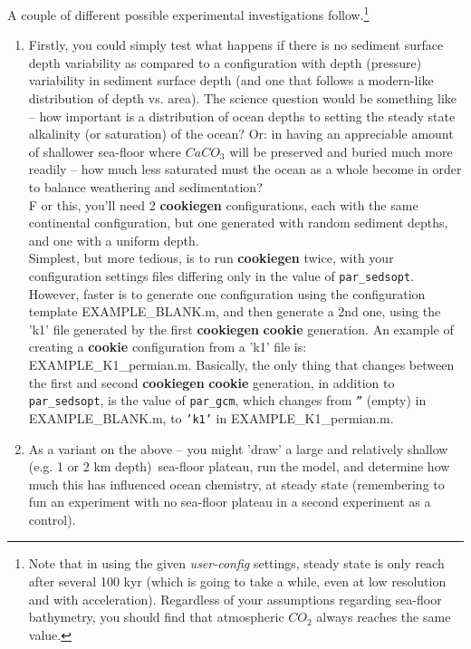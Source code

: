 \noindent A couple of different possible experimental investigations follow.\footnote{Note that in using the given \textit{user-config} settings, steady state is only reach after several 100 kyr (which is going to take a while, even at low resolution and with acceleration). Regardless of your assumptions regarding sea-floor bathymetry, you should find that atmospheric \(CO_{2}\) always reaches the same value.
}
\begin{enumerate}[noitemsep]

\vspace{1mm}
\item Firstly, you could simply test what happens if there is no sediment surface depth variability as compared to a configuration with depth (pressure) variability in sediment surface depth (and one that follows a modern-like distribution of depth vs. area). The science question would be something like -- how important is a distribution of ocean depths to setting the steady state alkalinity (or saturation) of the ocean? Or: in having an appreciable amount of shallower sea-floor where \(CaCO_{3}\) will be preserved and buried much more readily -- how much less saturated must the ocean as a whole become in order to balance weathering and sedimentation?
\\F or this, you'll need 2 \textbf{cookiegen} configurations, each with the same continental configuration, but one generated with random sediment depths, and one with a uniform depth.
\\Simplest, but more tedious, is to run \textbf{cookiegen} twice, with your  configuration settings files differing only in the value of \texttt{par\_sedsopt}. However, faster is to generate one configuration using the configuration template \textsf{\footnotesize EXAMPLE\_BLANK.m}, and then generate a 2nd one, using the 'k1' file generated by the first \textbf{cookiegen} \textbf{cookie} generation. An example of creating a \textbf{cookie} configuration from a 'k1' file is: \textsf{\footnotesize EXAMPLE\_K1\_permian.m}. Basically, the only thing that changes between the first and second \textbf{cookiegen} \textbf{cookie} generation, in addition to \texttt{par\_sedsopt}, is the value of \texttt{par\_gcm}, which changes from \texttt{''} (empty) in \textsf{\footnotesize EXAMPLE\_BLANK.m}, to \texttt{'k1'} in \textsf{\footnotesize EXAMPLE\_K1\_permian.m}.

\vspace{1mm}
\item As a variant on the above -- you might 'draw' a large and relatively shallow (e.g. 1 or 2 km depth)\ sea-floor plateau, run the model, and determine how much this has influenced ocean chemistry, at steady state (remembering to fun an experiment with no sea-floor plateau in a second experiment as a control).


\end{enumerate}
